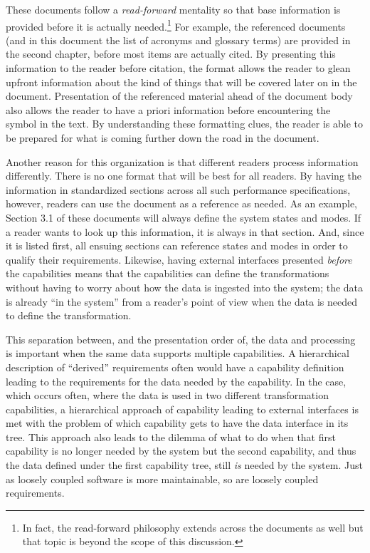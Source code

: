 These documents follow a {\em read-forward} mentality so that base information is provided before it is actually needed.\footnote{In fact, the read-forward philosophy extends across the documents as well but that topic is beyond the scope of this discussion.}
For example, the referenced documents (and in this document the list of acronyms and glossary terms) are provided in the second chapter, before most items are actually cited.
By presenting this information to the reader before citation, the format allows the reader to glean upfront information about the kind of things that will be covered later on in the document.
Presentation of the referenced material ahead of the document body also allows the reader to have a priori information before encountering the symbol in the text.
By understanding these formatting clues, the reader is able to be prepared for what is coming further down the road in the document.


Another reason for this organization is that different readers process information differently.
There is no one format that will be best for all readers.
By having the information in standardized sections across all such performance specifications, however, readers can use the document as a reference as needed.
As an example, Section 3.1 of these documents will always define the system states and modes.
If a reader wants to look up this information, it is always in that section.
And, since it is listed first, all ensuing sections can reference states and modes in order to qualify their requirements.
Likewise, having external interfaces presented {\em before} the capabilities means that the capabilities can define the transformations without having to worry about how the data is ingested into the system; the data is already ``in the system'' from a reader's point of view when the data is needed to define the transformation.


This separation between, and the presentation order of, the data and processing is important when the same data supports multiple capabilities.
A hierarchical description of ``derived'' requirements often would have a capability definition leading to the requirements for the data needed by the capability.
In the case, which occurs often, where the data is used in two different transformation capabilities, a hierarchical approach of capability leading to external interfaces is met with the problem of which capability gets to have the data interface in its tree.
This approach also leads to the dilemma of what to do when that first capability is no longer needed by the system but the second capability, and thus the data defined under the first capability tree, still {\em is} needed by the system.
Just as loosely coupled software is more maintainable, so are loosely coupled requirements.


